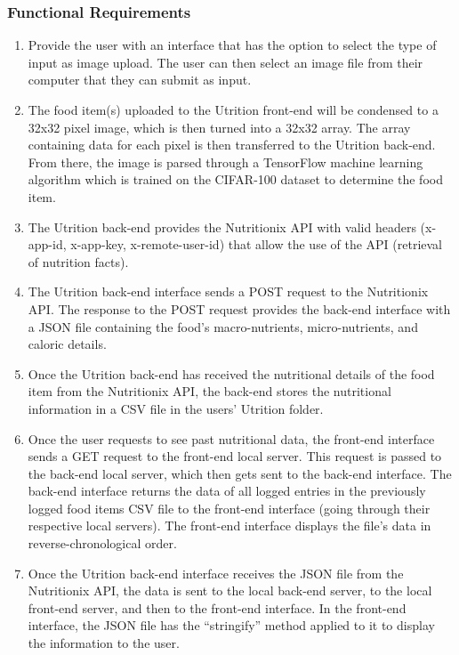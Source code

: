 \documentclass[12pt, titlepage]{article}
\begin{document}
\subsubsection{Functional Requirements}

\begin{enumerate}[{FR}1. ]
	\item Provide the user with an interface that has the option to select the type of input as image upload. The user can then select an image file from their computer that they can submit as input.
	\item The food item(s) uploaded to the Utrition front-end will be condensed to a 32x32 pixel image, which is then turned into a 32x32 array. The array containing data for each pixel is then transferred to the Utrition back-end. From there, the image is parsed through a TensorFlow machine learning algorithm which is trained on the CIFAR-100 dataset to determine the food item.
	\item The Utrition back-end provides the Nutritionix API with valid headers (x-app-id, x-app-key, x-remote-user-id) that allow the use of the API (retrieval of nutrition facts).
	\item The Utrition back-end interface sends a POST request to the Nutritionix API. The response to the POST request provides the back-end interface with a JSON file containing the food’s macro-nutrients, micro-nutrients, and caloric details.
	\item Once the Utrition back-end has received the nutritional details of the food item from the Nutritionix API, the back-end stores the nutritional information in a CSV file in the users’ Utrition folder.
	\item Once the user requests to see past nutritional data, the front-end interface sends a GET request to the front-end local server. This request is passed to the back-end local server, which then gets sent to the back-end interface. The back-end interface returns the data of all logged entries in the previously logged food items CSV file to the front-end interface (going through their respective local servers). The front-end interface displays the file's data in reverse-chronological order.
	\item Once the Utrition back-end interface receives the JSON file from the Nutritionix API, the data is sent to the local back-end server, to the local front-end server, and then to the front-end interface. In the front-end interface, the JSON file has the “stringify” method applied to it to display the information to the user.

\end{enumerate}
\end{document}
